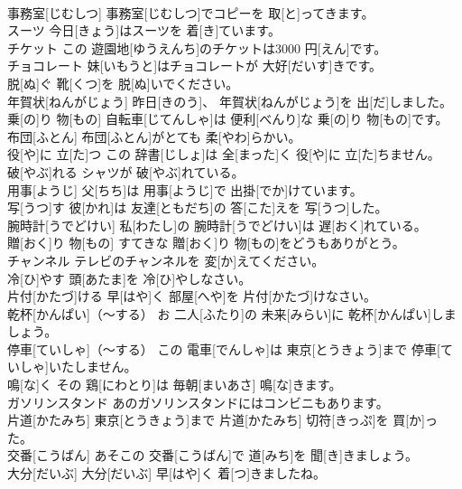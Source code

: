 \documentclass[8pt]{extreport}
\begin{document}
\begin{CJK}{UTF8}{min}
\\	事務室[じむしつ]	事務室[じむしつ]でコピーを 取[と]ってきます。		
\\	スーツ	今日[きょう]はスーツを 着[き]ています。		
\\	チケット	この 遊園地[ゆうえんち]のチケットは3000 円[えん]です。		
\\	チョコレート	妹[いもうと]はチョコレートが 大好[だいす]きです。		
\\	脱[ぬ]ぐ	靴[くつ]を 脱[ぬ]いでください。		
\\	年賀状[ねんがじょう]	昨日[きのう]、 年賀状[ねんがじょう]を 出[だ]しました。		
\\	乗[の]り 物[もの]	自転車[じてんしゃ]は 便利[べんり]な 乗[の]り 物[もの]です。		
\\	布団[ふとん]	布団[ふとん]がとても 柔[やわ]らかい。		
\\	役[や]に 立[た]つ	この 辞書[じしょ]は 全[まった]く 役[や]に 立[た]ちません。		
\\	破[やぶ]れる	シャツが 破[やぶ]れている。		
\\	用事[ようじ]	父[ちち]は 用事[ようじ]で 出掛[でか]けています。		
\\	写[うつ]す	彼[かれ]は 友達[ともだち]の 答[こた]えを 写[うつ]した。		
\\	腕時計[うでどけい]	私[わたし]の 腕時計[うでどけい]は 遅[おく]れている。		
\\	贈[おく]り 物[もの]	すてきな 贈[おく]り 物[もの]をどうもありがとう。		
\\	チャンネル	テレビのチャンネルを 変[か]えてください。		
\\	冷[ひ]やす	頭[あたま]を 冷[ひ]やしなさい。		
\\	片付[かたづ]ける	早[はや]く 部屋[へや]を 片付[かたづ]けなさい。		
\\	乾杯[かんぱい]（～する）	お 二人[ふたり]の 未来[みらい]に 乾杯[かんぱい]しましょう。		
\\	停車[ていしゃ]（～する）	この 電車[でんしゃ]は 東京[とうきょう]まで 停車[ていしゃ]いたしません。		
\\	鳴[な]く	その 鶏[にわとり]は 毎朝[まいあさ] 鳴[な]きます。		
\\	ガソリンスタンド	あのガソリンスタンドにはコンビニもあります。		
\\	片道[かたみち]	東京[とうきょう]まで 片道[かたみち] 切符[きっぷ]を 買[か]った。		
\\	交番[こうばん]	あそこの 交番[こうばん]で 道[みち]を 聞[き]きましょう。		
\\	大分[だいぶ]	大分[だいぶ] 早[はや]く 着[つ]きましたね。		

\end{CJK}
\end{document}
